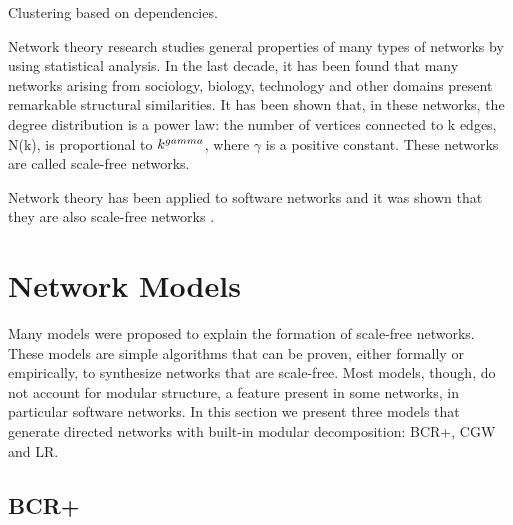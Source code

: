 Clustering based on dependencies.

Network theory research studies general properties of many types of networks by
using statistical analysis. In the last decade, it has been found that many
networks arising from sociology, biology, technology and other domains present
remarkable structural similarities. It has been shown that, in these networks,
the degree distribution is a power law: the number of vertices connected to k
edges, N(k), is proportional to $k^{\-gamma}$, where $\gamma$ is a positive
constant. These networks are called scale-free networks.

Network theory has been applied to software networks and it was shown that they
are also scale-free networks \cite{Myers2003,Valverde2003}.

%

\section{Network Models}

Many models were proposed to explain the formation of scale-free networks. These
models are simple algorithms that can be proven, either formally or empirically,
to synthesize networks that are scale-free. Most models, though, do not account
for modular structure, a feature present in some networks, in particular
software networks. In this section we present three models that generate
directed networks with built-in modular decomposition: BCR+, CGW and LR. 




\subsection{BCR+}

